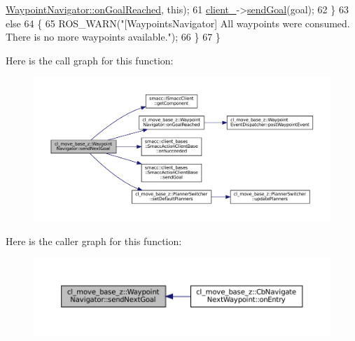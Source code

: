 \begin{DoxyCode}
      \hyperlink{classcl__move__base__z_1_1WaypointNavigator_ae10ba80b7e46b62096cac96609f66893}{WaypointNavigator::onGoalReached}, \textcolor{keyword}{this});
61     \hyperlink{classcl__move__base__z_1_1WaypointNavigator_afc5ad5c5d15f41437286b8fca1d3a324}{client\_}->\hyperlink{classsmacc_1_1client__bases_1_1SmaccActionClientBase_a9c47a5094ac8afb01680307fe5eca922}{sendGoal}(goal);
62   \}
63   \textcolor{keywordflow}{else}
64   \{
65     ROS\_WARN(\textcolor{stringliteral}{"[WaypointsNavigator] All waypoints were consumed. There is no more waypoints available."});
66   \}
67 \}
\end{DoxyCode}
Here is the call graph for this function\+:
\nopagebreak
\begin{figure}[H]
\begin{center}
\leavevmode
\includegraphics[width=350pt]{classcl__move__base__z_1_1WaypointNavigator_a1e0a8ff536d2d01a01063fd903029347_cgraph}
\end{center}
\end{figure}
Here is the caller graph for this function\+:
\nopagebreak
\begin{figure}[H]
\begin{center}
\leavevmode
\includegraphics[width=350pt]{classcl__move__base__z_1_1WaypointNavigator_a1e0a8ff536d2d01a01063fd903029347_icgraph}
\end{center}
\end{figure}
\mbox{\label{classcl__move__base__z_1_1WaypointNavigator_a477992dbb2eca9ee77a396d0fe1b084b}} 
